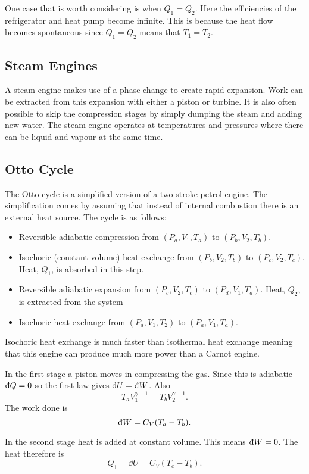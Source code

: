 \documentclass[a4paper]{article}
\newcommand{\ddbar}[1]{\text{\dj}{#1}}
\begin{document}
    One case that is worth considering is when \(Q_1 = Q_2\).
    Here the efficiencies of the refrigerator and heat pump become infinite.
    This is because the heat flow becomes spontaneous since \(Q_1 = Q_2\) means that \(T_1 = T_2\).
    
    \subsection{Steam Engines}
    A steam engine makes use of a phase change to create rapid expansion.
    Work can be extracted from this expansion with either a piston or turbine.
    It is also often possible to skip the compression stages by simply dumping the steam and adding new water.
    The steam engine operates at temperatures and pressures where there can be liquid and vapour at the same time.
    
    \subsection{Otto Cycle}
    The Otto cycle is a simplified version of a two stroke petrol engine.
    The simplification comes by assuming that instead of internal combustion there is an external heat source.
    The cycle is as follows:
    \begin{itemize}
        \item Reversible adiabatic compression from \((P_a, V_1, T_a)\) to \((P_b, V_2, T_b)\).
        \item Isochoric (constant volume) heat exchange from \((P_b, V_2, T_b)\) to \((P_c, V_2, T_c)\).
        Heat, \(Q_1\), is absorbed in this step.
        \item Reversible adiabatic expansion from \((P_c, V_2, T_c)\) to \((P_d, V_1, T_d)\).
        Heat, \(Q_2\), is extracted from the system
        \item Isochoric heat exchange from \((P_d, V_1, T_2)\) to \((P_a, V_1, T_a)\).
    \end{itemize}
    Isochoric heat exchange is much faster than isothermal heat exchange meaning that this engine can produce much more power than a Carnot engine.
    
    In the first stage a piston moves in compressing the gas.
    Since this is adiabatic \(\ddbar{Q} = 0\) so the first law gives \(\dd{U} = \ddbar{W}\).
    Also
    \[T_aV_1^{\gamma-1} = T_bV_2^{\gamma-1}.\]
    The work done is
    \[\ddbar{W} = C_V(T_a - T_b).\]
    
    In the second stage heat is added at constant volume.
    This means \(\ddbar{W} = 0\).
    The heat therefore is
    \[Q_1 = \dd{U} = C_V(T_c - T_b).\]
    
\end{document}
